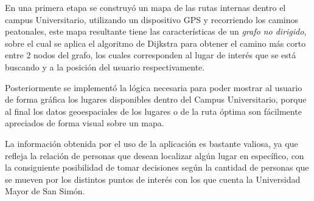 En una primera etapa se construyó un mapa de las rutas internas dentro el campus Universitario,  utilizando un dispositivo GPS y recorriendo los caminos peatonales, este mapa resultante tiene las características de un \emph{grafo no dirigido}, sobre el cual se aplica el algoritmo de Dijkstra para obtener el camino más corto entre 2 nodos del grafo, los cuales corresponden al lugar de interés que se está buscando y a la posición del usuario respectivamente.

Posteriormente se implementó la lógica necesaria para poder mostrar al usuario de forma gráfica los lugares disponibles dentro del Campus Universitario, porque al final los datos geoespaciales de los lugares o de la ruta óptima son fácilmente apreciados de forma visual sobre un mapa.


La información obtenida por el uso de la aplicación es bastante valiosa, ya que refleja la relación de personas que desean localizar algún lugar en específico, con la consiguiente posibilidad de  tomar decisiones según la cantidad de personas que se mueven por los distintos puntos de interés con los que cuenta la Universidad Mayor de San Simón.

